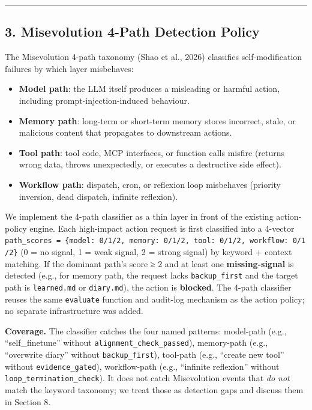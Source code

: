 \begin{center}\rule{0.5\linewidth}{0.5pt}\end{center}

\subsection{3. Misevolution 4-Path Detection
Policy}\label{misevolution-4-path-detection-policy}

The Misevolution 4-path taxonomy (Shao et al., 2026) classifies
self-modification failures by which layer misbehaves:

\begin{itemize}
\tightlist
\item
  \textbf{Model path}: the LLM itself produces a misleading or harmful
  action, including prompt-injection-induced behaviour.
\item
  \textbf{Memory path}: long-term or short-term memory stores incorrect,
  stale, or malicious content that propagates to downstream actions.
\item
  \textbf{Tool path}: tool code, MCP interfaces, or function calls
  misfire (returns wrong data, throws unexpectedly, or executes a
  destructive side effect).
\item
  \textbf{Workflow path}: dispatch, cron, or reflexion loop misbehaves
  (priority inversion, dead dispatch, infinite reflexion).
\end{itemize}

We implement the 4-path classifier as a thin layer in front of the
existing action-policy engine. Each high-impact action request is first
classified into a 4-vector
\texttt{path\_scores\ =\ \{model:\ 0/1/2,\ memory:\ 0/1/2,\ tool:\ 0/1/2,\ workflow:\ 0/1/2\}}
(0 = no signal, 1 = weak signal, 2 = strong signal) by keyword + context
matching. If the dominant path's score ≥ 2 and at least one
\textbf{missing-signal} is detected (e.g., for memory path, the request
lacks \texttt{backup\_first} and the target path is \texttt{learned.md}
or \texttt{diary.md}), the action is \textbf{blocked}. The 4-path
classifier reuses the same \texttt{evaluate} function and audit-log
mechanism as the action policy; no separate infrastructure was added.

\textbf{Coverage.} The classifier catches the four named patterns:
model-path (e.g., ``self\_finetune'' without
\texttt{alignment\_check\_passed}), memory-path (e.g., ``overwrite
diary'' without \texttt{backup\_first}), tool-path (e.g., ``create new
tool'' without \texttt{evidence\_gated}), workflow-path (e.g.,
``infinite reflexion'' without \texttt{loop\_termination\_check}). It
does not catch Misevolution events that \emph{do not} match the keyword
taxonomy; we treat those as detection gaps and discuss them in Section
8.

